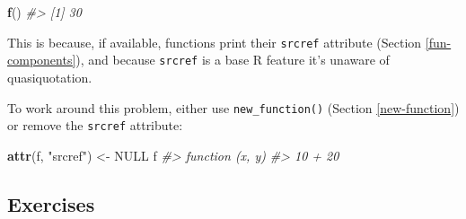 \documentclass[]{book}
\newenvironment{Shaded}{\begin{snugshade}}{\end{snugshade}}
\newcommand{\CommentTok}[1]{\textcolor[rgb]{0.37,0.37,0.37}{\textit{#1}}}
\newcommand{\KeywordTok}[1]{\textcolor[rgb]{0.27,0.27,0.27}{\textbf{#1}}}
\newcommand{\NormalTok}[1]{#1}
\newcommand{\OtherTok}[1]{\textcolor[rgb]{0.37,0.37,0.37}{#1}}
\newcommand{\StringTok}[1]{\textcolor[rgb]{0.5,0.5,0.5}{#1}}
\begin{document}
\begin{Shaded}
\begin{Highlighting}[]
\KeywordTok{f}\NormalTok{()}
\CommentTok{#> [1] 30}
\end{Highlighting}
\end{Shaded}

This is because, if available, functions print their \texttt{srcref} attribute (Section \ref{fun-components}), and because \texttt{srcref} is a base R feature it's unaware of quasiquotation.

To work around this problem, either use \texttt{new\_function()} (Section \ref{new-function}) or remove the \texttt{srcref} attribute:

\begin{Shaded}
\begin{Highlighting}[]
\KeywordTok{attr}\NormalTok{(f, }\StringTok{"srcref"}\NormalTok{) <-}\StringTok{ }\OtherTok{NULL}
\NormalTok{f}
\CommentTok{#> function (x, y) }
\CommentTok{#> 10 + 20}
\end{Highlighting}
\end{Shaded}

\hypertarget{exercises-9}{%
\subsection{Exercises}\label{exercises-9}}
\end{document}
